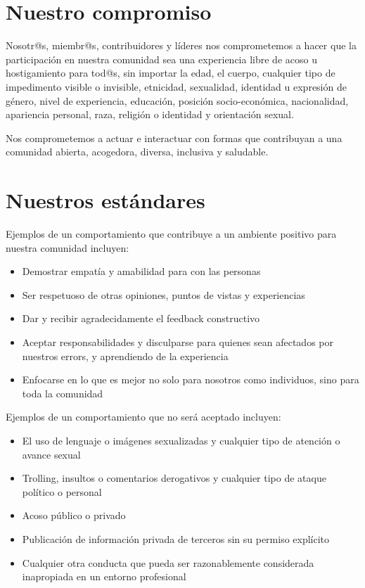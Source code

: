 \documentclass[
]{book}
\providecommand{\tightlist}{%
  \setlength{\itemsep}{0pt}\setlength{\parskip}{0pt}}
\begin{document}
\hypertarget{nuestro-compromiso}{%
\section{Nuestro compromiso}\label{nuestro-compromiso}}

Nosotr@s, miembr@s, contribuidores y líderes nos comprometemos a hacer que la participación en nuestra comunidad sea una experiencia libre de acoso u hostigamiento para tod@s, sin importar la edad, el cuerpo, cualquier tipo de impedimento visible o invisible, etnicidad, sexualidad, identidad u expresión de género, nivel de experiencia, educación, posición socio-económica, nacionalidad, apariencia personal, raza, religión o identidad y orientación sexual.

Nos comprometemos a actuar e interactuar con formas que contribuyan a una comunidad abierta, acogedora, diversa, inclusiva y saludable.

\hypertarget{nuestros-estuxe1ndares}{%
\section{Nuestros estándares}\label{nuestros-estuxe1ndares}}

Ejemplos de un comportamiento que contribuye a un ambiente positivo para nuestra comunidad incluyen:

\begin{itemize}
\tightlist
\item
  Demostrar empatía y amabilidad para con las personas
\item
  Ser respetuoso de otras opiniones, puntos de vistas y experiencias
\item
  Dar y recibir agradecidamente el feedback constructivo
\item
  Aceptar responsabilidades y disculparse para quienes sean afectados por nuestros errors, y aprendiendo de la experiencia
\item
  Enfocarse en lo que es mejor no solo para nosotros como individuos, sino para toda la comunidad
\end{itemize}

Ejemplos de un comportamiento que no será aceptado incluyen:

\begin{itemize}
\tightlist
\item
  El uso de lenguaje o imágenes sexualizadas y cualquier tipo de atención o avance sexual
\item
  Trolling, insultos o comentarios derogativos y cualquier tipo de ataque político o personal
\item
  Acoso público o privado
\item
  Publicación de información privada de terceros sin su permiso explícito
\item
  Cualquier otra conducta que pueda ser razonablemente considerada inapropiada en un entorno profesional
\end{itemize}
\end{document}
